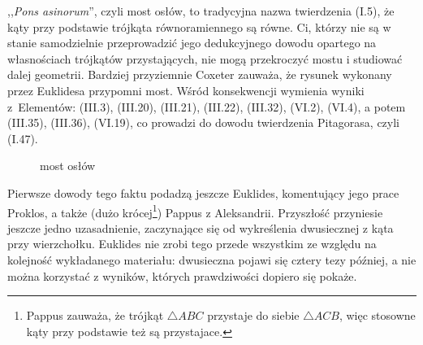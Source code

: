 %

,,\emph{Pons asinorum}'', czyli most osłów, to tradycyjna nazwa twierdzenia (I.5), że kąty przy podstawie trójkąta równoramiennego są równe.
Ci, którzy nie są w stanie samodzielnie przeprowadzić jego dedukcyjnego dowodu opartego na własnościach trójkątów przystających, nie mogą przekroczyć mostu i studiować dalej geometrii.
Bardziej przyziemnie Coxeter \cite[s. 22-24]{coxeter_1967} zauważa, że rysunek wykonany przez Euklidesa przypomni most.
Wśród konsekwencji wymienia wyniki z~Elementów: (III.3), (III.20), (III.21), (III.22), (III.32), (VI.2), (VI.4), a potem (III.35), (III.36), (VI.19), co prowadzi do dowodu twierdzenia Pitagorasa, czyli (I.47). %
%

\begin{figure}[H] \centering
\begin{comment}
\begin{tikzpicture}[scale=.5]
    \tkzDefPoint(90:-1){A}
    \tkzDefPoint(-55:5){C}
    \tkzDefPoint(235:5){B}
    \tkzDefPoint(-90:8){X}

    \tkzLabelPoint[above](A){$A$}
    \tkzLabelPoint[left](B){$B$}
    \tkzLabelPoint[right](C){$C$}
    \tkzInterLC(A,B)(A,X) \tkzGetPoints{XX}{D} %
    \tkzLabelPoint[left](D){$D$}
    \tkzDefLine[parallel=through D](B,C) \tkzGetPoint{XXX}
    \tkzInterLL(D,XXX)(A,C) \tkzGetPoint{E} %
    \tkzLabelPoint[right](E){$E$}
    
    \tkzMarkSegments[mark=|](A,B A,C)
    \tkzMarkSegments[mark=||](B,D C,E)
    \tkzDrawLines[add= 0 and 0, line width=0.2mm](B,E C,D)
    \tkzDrawLines[add= 0 and 0.5, line width=0.2mm](B,D C,E)
    \tkzDrawPolygon[line width=0.5mm](A,B,C)
    \tkzDrawPoints[size=4,color=black,fill=black!50](A,B,C,D,E)
\end{tikzpicture}
\end{comment}
    \caption{most osłów}
\end{figure}

Pierwsze dowody tego faktu podadzą jeszcze Euklides, komentujący jego prace Proklos, a także (dużo krócej\footnote{Pappus zauważa, że trójkąt $\triangle ABC$ przystaje do siebie $\triangle ACB$, więc stosowne kąty przy podstawie też są przystajace.}) Pappus z Aleksandrii.
%
%
Przyszłość przyniesie jeszcze jedno uzasadnienie, zaczynające się od wykreślenia dwusiecznej z kąta przy wierzchołku.
%
Euklides nie zrobi tego przede wszystkim ze względu na kolejność wykładanego materiału: dwusieczna pojawi się cztery tezy później, a nie można korzystać z wyników, których prawdziwości dopiero się pokaże.


%